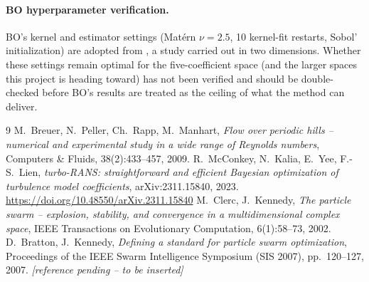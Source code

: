 \paragraph{BO hyperparameter verification.}  BO's kernel and estimator
settings (Mat\'ern $\nu=2.5$, 10 kernel-fit restarts, Sobol' initialization)
are adopted from \cite{bo_hyperparams_ref}, a study carried out in two
dimensions.  Whether these settings remain optimal for the five-coefficient
space (and the larger spaces this project is heading toward) has not been
verified and should be double-checked before BO's results are treated as
the ceiling of what the method can deliver.

\begin{thebibliography}{9}
M.\ Breuer, N.\ Peller, Ch.\ Rapp, M.\ Manhart,
\emph{Flow over periodic hills -- numerical and experimental study in a wide
range of Reynolds numbers}, Computers \& Fluids, 38(2):433--457, 2009.
R.\ McConkey, N.\ Kalia, E.\ Yee, F.-S.\ Lien,
\emph{turbo-RANS: straightforward and efficient Bayesian optimization of
turbulence model coefficients}, arXiv:2311.15840, 2023.
\url{https://doi.org/10.48550/arXiv.2311.15840}
M.\ Clerc, J.\ Kennedy,
\emph{The particle swarm -- explosion, stability, and convergence in a
multidimensional complex space}, IEEE Transactions on Evolutionary
Computation, 6(1):58--73, 2002.
D.\ Bratton, J.\ Kennedy,
\emph{Defining a standard for particle swarm optimization},
Proceedings of the IEEE Swarm Intelligence Symposium (SIS 2007),
pp.\ 120--127, 2007.
\textit{[reference pending -- to be inserted]}
\end{thebibliography}



